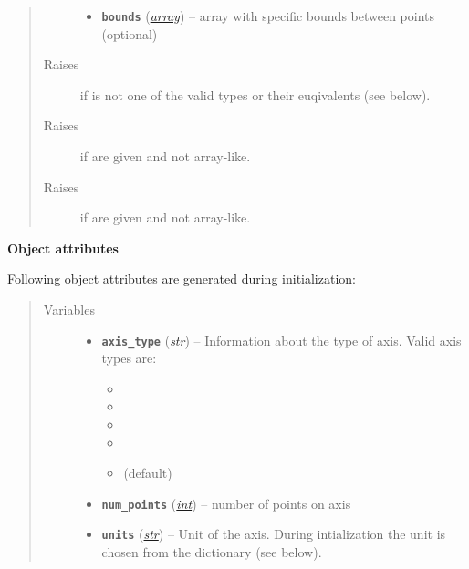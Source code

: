 \documentclass[a4paper,10pt,english]{sphinxmanual}
\begin{document}
\begin{fulllineitems}
\begin{quote}
\begin{description}
\begin{itemize}
\item {} 
\textbf{\texttt{bounds}} (\href{http://docs.python.org/2.7/library/array.html\#module-array}{\emph{array}}) -- array with specific bounds between points (optional)

\end{itemize}

\item[{Raises}] \leavevmode
{}
if  is not one of the valid types or 
their euqivalents (see below).

\item[{Raises}] \leavevmode
{}
if  are given and not array-like.

\item[{Raises}] \leavevmode
{}
if  are given and not array-like.

\end{description}\end{quote}

\textbf{Object attributes}

Following object attributes are generated during initialization:
\begin{quote}\begin{description}
\item[{Variables}] \leavevmode\begin{itemize}
\item {} 
\textbf{\texttt{axis\_type}} (\href{http://docs.python.org/2.7/library/functions.html\#str}{\emph{str}}) -- 
Information about the type of axis. Valid axis types are:
\begin{itemize}
\item {} 

\item {} 

\item {} 

\item {} 

\item {} 
 (default)

\end{itemize}


\item {} 
\textbf{\texttt{num\_points}} (\href{http://docs.python.org/2.7/library/functions.html\#int}{\emph{int}}) -- number of points on axis

\item {} 
\textbf{\texttt{units}} (\href{http://docs.python.org/2.7/library/functions.html\#str}{\emph{str}}) -- Unit of the axis. During intialization the unit is 
chosen from the  dictionary (see below).


\end{itemize}
\end{description}
\end{quote}
\end{fulllineitems}
\end{document}
